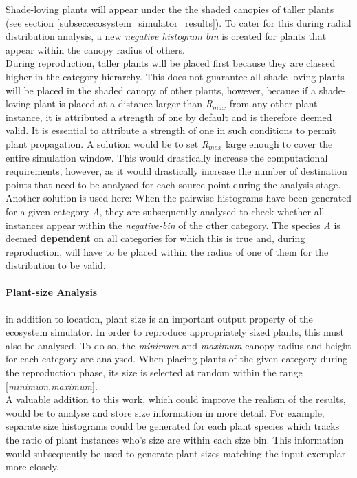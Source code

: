 Shade-loving plants will appear under the the shaded canopies of taller plants (see section \ref{subsec:ecosystem_simulator_results}). To cater for this during radial distribution analysis, a new \textit{negative histogram bin} is created for plants that appear within the canopy radius of others.\\
During reproduction, taller plants will be placed first because they are classed higher in the category hierarchy. This does not guarantee all shade-loving plants will be placed in the shaded canopy of other plants, however, because if a shade-loving plant is placed at a distance larger than \textit{R$_{max}$} from any other plant instance, it is attributed a strength of one by default and is therefore deemed valid. It is essential to attribute a strength of one in such conditions to permit plant propagation. A solution would be to set \textit{R$_{max}$} large enough to cover the entire simulation window. This would drastically increase the computational requirements, however, as it would drastically increase the number of destination points that need to be analysed for each source point during the analysis stage. Another solution is used here: When the pairwise histograms have been generated for a given category \textit{A}, they are subsequently analysed to check whether all instances appear within the \textit{negative-bin} of the other category. The species \textit{A} is deemed \textbf{dependent} on all categories for which this is true and, during reproduction, will have to be placed within the radius of one of them for the distribution to be valid.

\paragraph{Plant-size Analysis}

in addition to location, plant size is an important output property of the ecosystem simulator. In order to reproduce appropriately sized plants, this must also be analysed. To do so, the \textit{minimum} and \textit{maximum} canopy radius and height for each category are analysed. When placing plants of the given category during the reproduction phase, its size is selected at random within the range [\textit{minimum},\textit{maximum}].\\
A valuable addition to this work, which could improve the realism of the results, would be to analyse and store size information in more detail. For example, separate size histograms could be generated for each plant species which tracks the ratio of plant instances who's size are within each size bin. This information would subsequently be used to generate plant sizes matching the input exemplar more closely.\\


